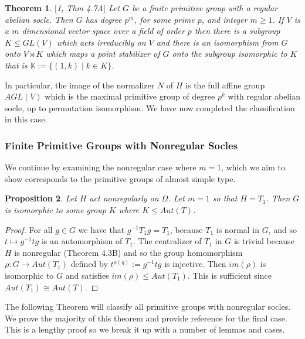 \documentclass[]{article}
\newtheorem{thm}{Theorem}[section]
\newtheorem{prop}[thm]{Proposition}
\theoremstyle{definition}
\begin{document}
\begin{thm} $[$1, Thm 4.7A$]$
	Let $G$ be a finite primitive group with a regular abelian socle. Then $G$ has degree $p^m$, for some prime $p$, and integer $m\geq 1$. If $V$ is a $m$ dimensional vector space over a field of order $p$ then there is a subgroup $K \leq GL(V)$ which acts irreducibly on $V$ and there is an isomorphism from $G$ onto $V \rtimes K$ which maps a point stabilizer of $G$ onto the subgroup isomorphic to $K$ that is $\mathbb{K}:=\{(1,k) \; | \; k \in K \}$.
\end{thm}

In particular, the image of the normalizer $N$ of $H$ is the full affine group $AGL(V)$ which is the maximal primitive group of degree $p^k$ with regular abelian socle, up to permutation isomorphism. We have now completed the classification in this case.

\subsubsection{Finite Primitive Groups with Nonregular Socles}

We continue by examining the nonregular case where $m=1$, which we aim to show corresponds to the primitive groups of almost simple type.

\begin{prop} \label{prop:ONSalmostsimple}
	Let $H$ act nonregularly on $\Omega$. Let $m=1$ so that $H=T_1$. Then $G$ is isomorphic to some group $K$ where $K \leqslant Aut(T)$.
\end{prop}
\begin{proof}
	For all $g \in G$ we have that $g^{-1} T_1 g = T_1$, because $T_1$ is normal in $G$, and so $t \mapsto g^{-1}tg$ is an automorphism of $T_1$. The centralizer of $T_1$ in $G$ is trivial because $H$ is nonregular (Theorem 4.3B) and so the group homomorphism $\rho:G \rightarrow Aut(T_1)$ defined by $t^{\rho(g)}:=g^{-1}tg$ is injective. Then $im(\rho)$ is isomorphic to $G$ and satisfies $im(\rho) \leqslant Aut(T_1)$. This is sufficient since $Aut(T_1) \cong Aut(T)$.
\end{proof}

The following Theorem will classify all primitive groups with nonregular socles. We prove the majority of this theorem and provide reference for the final case. This is a lengthy proof so we break it up with a number of lemmas and cases.
\end{document}
